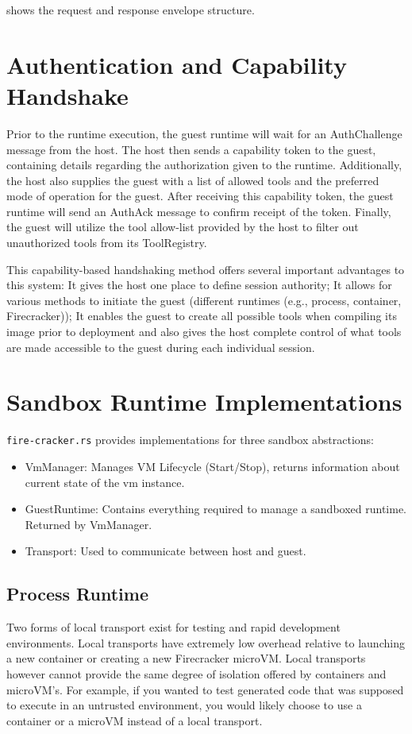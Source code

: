  shows the request and response envelope structure.
\section{Authentication and Capability Handshake}
Prior to the runtime execution, the guest runtime will wait for an AuthChallenge
message from the host. The host then sends a capability token to the guest,
containing details regarding the authorization given to the runtime. Additionally,
the host also supplies the guest with a list of allowed tools and the preferred
mode of operation for the guest. After receiving this capability token, the guest
runtime will send an AuthAck message to confirm receipt of the token. Finally,
the guest will utilize the tool allow-list provided by the host to filter out
unauthorized tools from its ToolRegistry.

This capability-based handshaking method offers several important advantages to
this system: It gives the host one place to define session authority; It allows
for various methods to initiate the guest (different runtimes (e.g., process,
container, Firecracker)); It enables the guest to create all possible tools when
compiling its image prior to deployment and also gives the host complete control
of what tools are made accessible to the guest during each individual session.

\section{Sandbox Runtime Implementations}
\texttt{fire-cracker.rs} provides implementations for three sandbox abstractions:
\begin{itemize}
    \item VmManager: Manages VM Lifecycle (Start/Stop), returns information about
    current state of the vm instance.
    \item GuestRuntime: Contains everything required to manage a sandboxed
    runtime. Returned by VmManager.
    \item Transport: Used to communicate between host and guest.
\end{itemize}

\subsection{Process Runtime}
Two forms of local transport exist for testing and rapid development
environments. Local transports have extremely low overhead relative to launching
a new container or creating a new Firecracker microVM. Local transports however
cannot provide the same degree of isolation offered by containers and
microVM's. For example, if you wanted to test generated code that was supposed
to execute in an untrusted environment, you would likely choose to use a
container or a microVM instead of a local transport.

